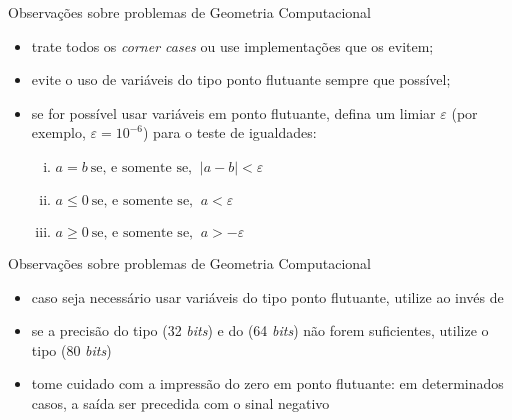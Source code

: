 \begin{frame}[fragile]{Observações sobre problemas de Geometria Computacional}

    \begin{itemize}
        \item trate todos os \textit{corner cases} ou use implementações que os evitem;

        \item evite o uso de variáveis do tipo ponto flutuante sempre que possível;

        \item se for possível usar variáveis em ponto flutuante, defina um limiar $\varepsilon$ 
        (por exemplo, $\varepsilon = 10^{-6}$) para o teste de igualdades:

        \begin{enumerate}[i.]
            \item $a = b \ \mbox{se, e somente se, }\ |a - b| < \varepsilon$
            \item $a \leq 0 \ \mbox{se, e somente se, }\ a < \varepsilon$
            \item $a \geq 0 \ \mbox{se, e somente se, }\ a > -\varepsilon$
        \end{enumerate}


    \end{itemize}

\end{frame}

\begin{frame}[fragile]{Observações sobre problemas de Geometria Computacional}

    \begin{itemize}
        \item caso seja necessário usar variáveis do tipo ponto flutuante, utilize 
             ao invés de 

        \item se a precisão do tipo  (32 \textit{bits}) e do  
        (64 \textit{bits}) não forem suficientes, utilize o tipo 
        (80 \textit{bits})

        \item tome cuidado com a impressão do zero em ponto flutuante: em determinados casos, 
        a saída ser precedida com o sinal negativo

    \end{itemize}

\end{frame}

